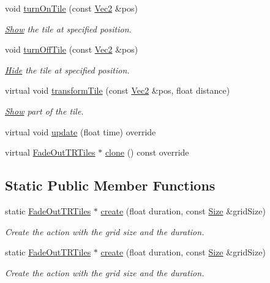 \begin{DoxyCompactItemize}
void \hyperlink{classFadeOutTRTiles_a9054a06a45fd2f88a3bab16643258123}{turn\+On\+Tile} (const \hyperlink{classVec2}{Vec2} \&pos)
\begin{DoxyCompactList}\small\item\em \hyperlink{classShow}{Show} the tile at specified position. \end{DoxyCompactList}\item 
void \hyperlink{classFadeOutTRTiles_a4db8d8897034bc19d449560174bd29fa}{turn\+Off\+Tile} (const \hyperlink{classVec2}{Vec2} \&pos)
\begin{DoxyCompactList}\small\item\em \hyperlink{classHide}{Hide} the tile at specified position. \end{DoxyCompactList}\item 
virtual void \hyperlink{classFadeOutTRTiles_ab7fc12d0e4293a24947dc6c3aaeabaca}{transform\+Tile} (const \hyperlink{classVec2}{Vec2} \&pos, float distance)
\begin{DoxyCompactList}\small\item\em \hyperlink{classShow}{Show} part of the tile. \end{DoxyCompactList}\item 
virtual void \hyperlink{classFadeOutTRTiles_af10e18a667d01702f04bb6f0405d5228}{update} (float time) override
\item 
virtual \hyperlink{classFadeOutTRTiles}{Fade\+Out\+T\+R\+Tiles} $\ast$ \hyperlink{classFadeOutTRTiles_aa1b433c762335359829791f3b1d2b849}{clone} () const override
\end{DoxyCompactItemize}
\subsection*{Static Public Member Functions}
\begin{DoxyCompactItemize}
\item 
static \hyperlink{classFadeOutTRTiles}{Fade\+Out\+T\+R\+Tiles} $\ast$ \hyperlink{classFadeOutTRTiles_ab885c7c48f20e0182c0a29729827252a}{create} (float duration, const \hyperlink{classSize}{Size} \&grid\+Size)
\begin{DoxyCompactList}\small\item\em Create the action with the grid size and the duration. \end{DoxyCompactList}\item 
static \hyperlink{classFadeOutTRTiles}{Fade\+Out\+T\+R\+Tiles} $\ast$ \hyperlink{classFadeOutTRTiles_a80f9dbf41d1034fde40bbfc7c6a5af53}{create} (float duration, const \hyperlink{classSize}{Size} \&grid\+Size)
\begin{DoxyCompactList}\small\item\em Create the action with the grid size and the duration. \end{DoxyCompactList}\end{DoxyCompactItemize}
